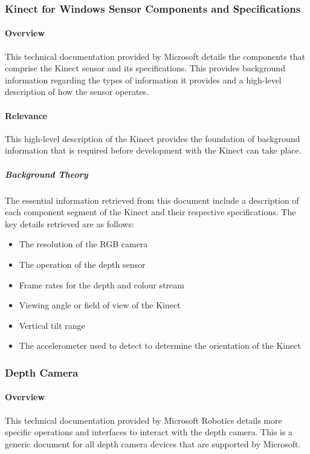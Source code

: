 \subsubsection{Kinect for Windows Sensor Components and Specifications \cite{msdnKinectSpecs2017}}

\paragraph{Overview}
This technical documentation provided by Microsoft details the components that comprise the Kinect sensor and its specifications. This provides background information regarding the types of information it provides and a high-level description of how the sensor operates.

\paragraph{Relevance}
This high-level description of the Kinect provides the foundation of background information that is required before development with the Kinect can take place. 

\subparagraph{Background Theory}
The essential information retrieved from this document include a description of each component segment of the Kinect and their respective specifications. The key details retrieved are as follows: 
\begin{itemize}
	\item The resolution of the RGB camera
	\item The operation of the depth sensor
	\item Frame rates for the depth and colour stream
	\item Viewing angle or field of view of the Kinect
	\item Vertical tilt range
	\item The accelerometer used to detect to determine the orientation of the Kinect 
\end{itemize}

\subsubsection{Depth Camera \cite{msdnDepthCamKinect2017}}

\paragraph{Overview}
This technical documentation provided by Microsoft Robotics details more specific operations and interfaces to interact with the depth camera. This is a generic document for all depth camera devices that are supported by Microsoft.  

